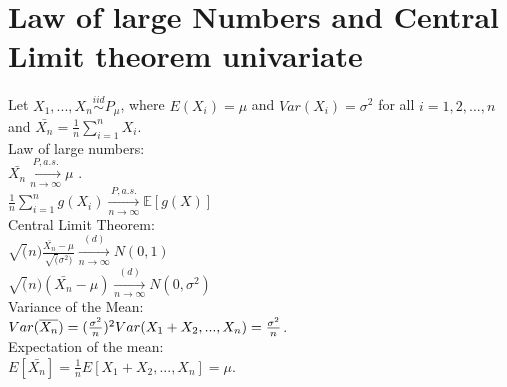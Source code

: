 \section{Law of large Numbers and Central Limit theorem univariate}
Let $X_1, ..., X_n \stackrel{iid}{\sim} P_{\mu}$, where $E(X_i)=\mu$ and $Var(X_i)=\sigma^2$ for all $i=1,2,...,n$ and $\bar{X_n}= \frac{1}{n} \sum_{i=1}^{n} X_i$.\\

Law of large numbers:\\

$\bar{X_n} \xrightarrow[n \rightarrow \infty]{P, a.s.} \mu$ .\\

$ \frac{1}{n} \sum_{i=1}^{n} g(X_i) \xrightarrow[n \rightarrow \infty]{P, a.s.} \mathbb{E}[g(X)]$\\

Central Limit Theorem:\\

$\sqrt(n)\frac{\bar{X_n}-\mu}{\sqrt(\sigma^2)} \xrightarrow[n \rightarrow \infty]{(d)} N(0,1)$\\

$\sqrt(n)(\bar{X_n}-\mu) \xrightarrow[n \rightarrow \infty]{(d)} N(0,\sigma^2)$\\

Variance of the Mean:\\

$Var(\overline{X_n})=\\
(\frac{\sigma^2}{n})^2 Var(X_1 + X_2,...,X_n) =  \frac{\sigma^2}{n}$.\\

Expectation of the mean:\\

$E[\bar{X_n}]=\frac{1}{n}E[X_1 + X_2,...,X_n] = \mu$.
